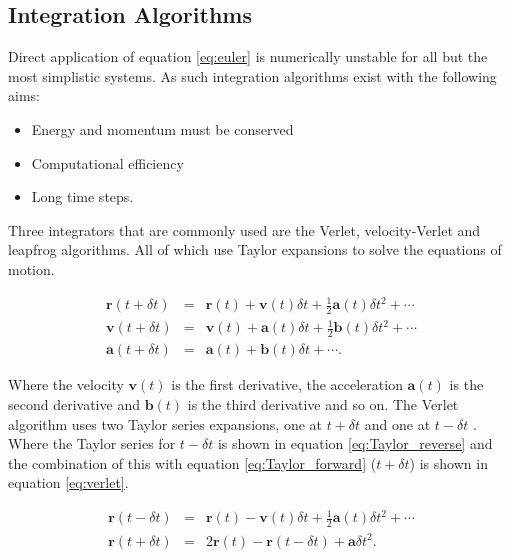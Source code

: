\subsection{Integration Algorithms}

Direct application of equation \ref{eq:euler} is numerically unstable for all but the most simplistic systems.  As such integration algorithms exist with the following aims:

\begin{itemize}
\item Energy and momentum must be conserved
\item Computational efficiency
\item Long time steps.
\end{itemize}

Three integrators that are commonly used are the Verlet, velocity-Verlet and leapfrog algorithms.  All of which use Taylor expansions to solve the equations of motion.

\begin{eqnarray} \label{eq:Taylor_forward}
\ \mathbf{r}(t+ \delta t) &=& \mathbf{r}(t) + \mathbf{v}(t) \delta t + \frac{1}{2} \mathbf{a}(t) \delta t^2 + \cdots \\
\ \mathbf{v}(t+ \delta t) &=& \mathbf{v}(t) + \mathbf{a}(t) \delta t + \frac{1}{2} \mathbf{b}(t) \delta t^2 + \cdots \\
\ \mathbf{a}(t+\delta t) &=& \mathbf{a}(t) + \mathbf{b}(t) \delta t + \cdots .
\end{eqnarray}

Where the velocity $\mathbf{v}(t)$ is the first derivative, the acceleration $\mathbf{a}(t)$ is the second derivative and $\mathbf{b}(t)$ is the third derivative and so on.  The Verlet algorithm \cite{Verlet} uses two Taylor series expansions, one at $t+ \delta t$ and one at $t - \delta t$ .  Where the Taylor series for $t - \delta t$ is shown in equation \ref{eq:Taylor_reverse} and the combination of this with equation \ref{eq:Taylor_forward} ($t + \delta t$) is shown in equation \ref{eq:verlet}.

\begin{eqnarray} \label{eq:Taylor_reverse}
\ \mathbf{r}(t- \delta t) &=& \mathbf{r}(t) - \mathbf{v}(t) \delta t + \frac{1}{2} \mathbf{a}(t) \delta t^2 + \cdots \\ \label{eq:verlet}
\ \mathbf{r}(t+ \delta t) &=& 2 \mathbf{r}(t) - \mathbf{r}(t- \delta t) + \mathbf{a} \delta t^2 .
\end{eqnarray}

